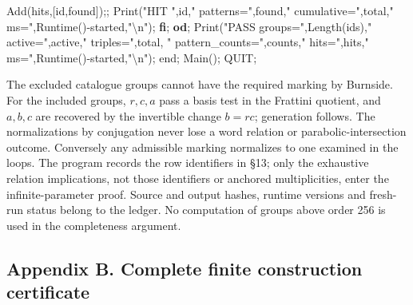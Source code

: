\documentclass[
  10pt,
  letterpaper,
]{article}
\newenvironment{Shaded}{}{}
\newcommand{\BuiltInTok}[1]{\textcolor[rgb]{0.00,0.50,0.00}{#1}}
\newcommand{\ControlFlowTok}[1]{\textcolor[rgb]{0.00,0.44,0.13}{\textbf{#1}}}
\newcommand{\FunctionTok}[1]{\textcolor[rgb]{0.02,0.16,0.49}{#1}}
\newcommand{\NormalTok}[1]{#1}
\newcommand{\OperatorTok}[1]{\textcolor[rgb]{0.40,0.40,0.40}{#1}}
\newcommand{\StringTok}[1]{\textcolor[rgb]{0.25,0.44,0.63}{#1}}
\newcommand{\VariableTok}[1]{\textcolor[rgb]{0.10,0.09,0.49}{#1}}
\begin{document}
\begin{Shaded}
\begin{Highlighting}[]
  \BuiltInTok{Add}\NormalTok{(}\VariableTok{hits}\OperatorTok{,}\NormalTok{[}\VariableTok{id}\OperatorTok{,}\VariableTok{found}\NormalTok{])}\OperatorTok{;;}
  \BuiltInTok{Print}\NormalTok{(}\StringTok{"HIT "}\OperatorTok{,}\VariableTok{id}\OperatorTok{,}\StringTok{" patterns="}\OperatorTok{,}\VariableTok{found}\OperatorTok{,}\StringTok{" cumulative="}\OperatorTok{,}\VariableTok{total}\OperatorTok{,}\StringTok{" ms="}\OperatorTok{,}\BuiltInTok{Runtime}\NormalTok{()}\OperatorTok{{-}}\VariableTok{started}\OperatorTok{,}\StringTok{"\textbackslash{}n"}\NormalTok{)}\OperatorTok{;}
 \ControlFlowTok{fi}\OperatorTok{;}
\ControlFlowTok{od}\OperatorTok{;}
\BuiltInTok{Print}\NormalTok{(}\StringTok{"PASS groups="}\OperatorTok{,}\BuiltInTok{Length}\NormalTok{(}\VariableTok{ids}\NormalTok{)}\OperatorTok{,}\StringTok{" active="}\OperatorTok{,}\VariableTok{active}\OperatorTok{,}\StringTok{" triples="}\OperatorTok{,}\VariableTok{total}\OperatorTok{,}
 \StringTok{" pattern\_counts="}\OperatorTok{,}\VariableTok{counts}\OperatorTok{,}\StringTok{" hits="}\OperatorTok{,}\VariableTok{hits}\OperatorTok{,}\StringTok{" ms="}\OperatorTok{,}\BuiltInTok{Runtime}\NormalTok{()}\OperatorTok{{-}}\VariableTok{started}\OperatorTok{,}\StringTok{"\textbackslash{}n"}\NormalTok{)}\OperatorTok{;}
\FunctionTok{end}\OperatorTok{;}
\VariableTok{Main}\NormalTok{()}\OperatorTok{;}
\VariableTok{QUIT}\OperatorTok{;}
\end{Highlighting}
\end{Shaded}

The excluded catalogue groups cannot have the required marking by
Burnside. For the included groups, \(r,c,a\) pass a basis test in the
Frattini quotient, and \(a,b,c\) are recovered by the invertible change
\(b=rc\); generation follows. The normalizations by conjugation never
lose a word relation or parabolic-intersection outcome. Conversely any
admissible marking normalizes to one examined in the loops. The program
records the row identifiers in §13; only the exhaustive relation
implications, not those identifiers or anchored multiplicities, enter
the infinite-parameter proof. Source and output hashes, runtime versions
and fresh-run status belong to the ledger. No computation of groups
above order 256 is used in the completeness argument.

\subsection{Appendix B. Complete finite construction
certificate}\label{appendix-b.-complete-finite-construction-certificate}
\end{document}
